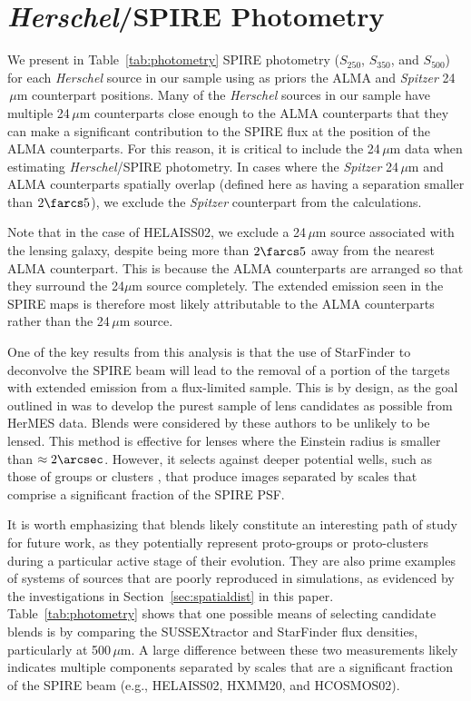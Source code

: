 \documentclass[iop]{emulateapj}
\begin{document}




\appendix

\section{{\it Herschel}/SPIRE Photometry}

We present in Table~\ref{tab:photometry} SPIRE photometry ($S_{250}$,
$S_{350}$, and $S_{500}$) for each {\it Herschel} source in our sample using as
priors the ALMA and {\it Spitzer} 24$\,\mu$m counterpart positions.  Many of
the {\it Herschel} sources in our sample have multiple 24$\,\mu$m counterparts
close enough to the ALMA counterparts that they can make a significant
contribution to the SPIRE flux at the position of the ALMA counterparts.  For
this reason, it is critical to include the 24$\,\mu$m data when estimating {\it
Herschel}/SPIRE photometry.  In cases where the {\it Spitzer} 24$\,\mu$m and
ALMA counterparts spatially overlap (defined here as having a separation
smaller than $2\farcs5$), we exclude the {\it Spitzer} counterpart from the
calculations.  

Note that in the case of HELAISS02, we exclude a 24$\,\mu$m source associated
with the lensing galaxy, despite being more than $2\farcs5$ away from the
nearest ALMA counterpart.  This is because the ALMA counterparts are arranged
so that they surround the 24$\mu$m source completely.  The extended emission
seen in the SPIRE maps is therefore most likely attributable to the ALMA
counterparts rather than the 24$\,\mu$m source.

One of the key results from this analysis is that the use of StarFinder to
deconvolve the SPIRE beam will lead to the removal of a portion of the targets
with extended emission from a flux-limited sample.  This is by design, as the
goal outlined in \citet{Wardlow:2013lr} was to develop the purest sample of
lens candidates as possible from HerMES data.  Blends were considered by these
authors to be unlikely to be lensed.  This method is effective for lenses where
the Einstein radius is smaller than $\approx 2\arcsec$.  However, it selects
against deeper potential wells, such as those of groups or clusters
\citep[e.g., HLock01][]{Gavazzi:2011lr}, that produce images separated by
scales that comprise a significant fraction of the SPIRE PSF.

It is worth emphasizing that blends likely constitute an interesting path of
study for future work, as they potentially represent proto-groups or
proto-clusters during a particular active stage of their evolution.  They are
also prime examples of systems of sources that are poorly reproduced in
simulations, as evidenced by the investigations in
Section~\ref{sec:spatialdist} in this paper.  Table~\ref{tab:photometry} shows
that one possible means of selecting candidate blends is by comparing the
SUSSEXtractor and StarFinder flux densities, particularly at 500$\,\mu$m.  A
large difference between these two measurements likely indicates multiple
components separated by scales that are a significant fraction of the SPIRE
beam (e.g., HELAISS02, HXMM20, and HCOSMOS02).

\clearpage

\end{document}

